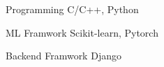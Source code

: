 

\begin{cvskills}

  \cvskill
    {Programming} %
    {C/C++, Python} %

  \cvskill
    {ML Framwork} %
    {Scikit-learn, Pytorch} %

  \cvskill
    {Backend Framwork} %
    {Django} %




\end{cvskills}